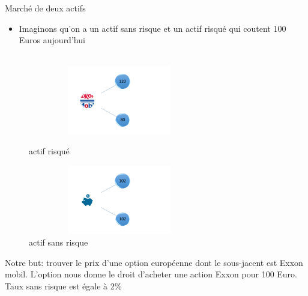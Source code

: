 \documentclass[10pt]{beamer}
\begin{document}
\begin{frame}{Marché de deux actifs}{}
  \begin{itemize}
    \item Imaginons qu'on a un actif sans risque et un actif risqué qui coutent 100 Euros aujourd'hui\\~\\
  \end{itemize}
  \begin{figure}[!tbp]
  \centering
  \begin{minipage}[b]{0.4\textwidth}
    \includegraphics[width=8cm,height=3cm,keepaspectratio]{AAUgraphics/Picture2.png}
    \caption{actif risqué}
  \end{minipage}
  \hfill
  \begin{minipage}[b]{0.4\textwidth}
    \includegraphics[width=8cm,height=3cm,keepaspectratio]{AAUgraphics/Picture3.png}
    \caption{actif sans risque}
  \end{minipage}
\end{figure}

\small{
Notre but: trouver le prix d'une option européenne dont le sous-jacent est Exxon mobil. L'option nous donne le droit d'acheter une action Exxon pour 100 Euro. Taux sans risque est égale à 2\% 
}
  
\end{frame}
\end{document}
